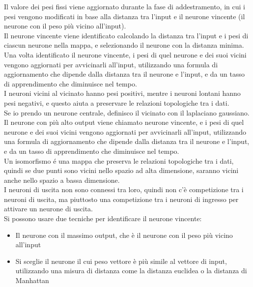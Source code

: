 Il valore dei pesi fissi viene aggiornato durante la fase di addestramento, in cui i pesi vengono modificati in base alla distanza tra l'input e il neurone vincente (il neurone con il peso più vicino all'input).\\
Il neurone vincente viene identificato calcolando la distanza tra l'input e i pesi di ciascun neurone nella mappa, e selezionando il neurone con la distanza minima.\\
Una volta identificato il neurone vincente, i pesi di quel neurone e dei suoi vicini vengono aggiornati per avvicinarli all'input, utilizzando una formula di aggiornamento che dipende dalla distanza tra il neurone e l'input, e da un tasso di apprendimento che diminuisce nel tempo.\\

I neuroni vicini al vicinato hanno pesi positivi, mentre i neuroni lontani hanno pesi negativi, e questo aiuta a preservare le relazioni topologiche tra i dati.\\
Se io prendo un neurone centrale, definisco il vicinato con il laplaciano gaussiano. 
Il neurone con più alto output viene chiamato neurone vincente, e i pesi di quel neurone e dei suoi vicini vengono aggiornati per avvicinarli all'input, utilizzando una formula di aggiornamento che dipende dalla distanza tra il neurone e l'input, e da un tasso di apprendimento che diminuisce nel tempo.\\

Un isomorfismo é una mappa che preserva le relazioni topologiche tra i dati, quindi se due punti sono vicini nello spazio ad alta dimensione, saranno vicini anche nello spazio a bassa dimensione.\\

I neuroni di uscita non sono connessi tra loro, quindi non c'è competizione tra i neuroni di uscita, ma piuttosto una competizione tra i neuroni di ingresso per attivare un neurone di uscita.\\

Si possono usare due tecniche per identificare il neurone vincente:
\begin{itemize}
    \item Il neurone con il massimo output, che è il neurone con il peso più vicino all'input
    \item Si sceglie il neurone il cui peso vettore è più simile al vettore di input, utilizzando una misura di distanza come la distanza euclidea o la distanza di Manhattan
\end{itemize}

